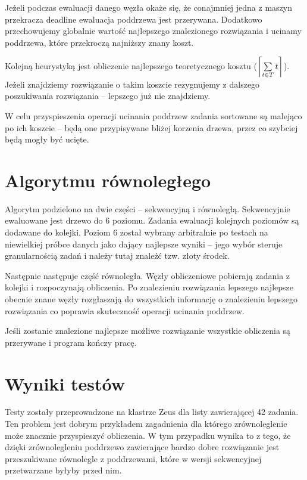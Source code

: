 \documentclass[a4paper]{article}
\DeclarePairedDelimiter{\ceil}{\lceil}{\rceil}
\begin{document}
Jeżeli podczas ewaluacji danego węzła okaże się, że conajmniej jedna z maszyn przekracza deadline ewaluacja poddrzewa jest przerywana. Dodatkowo przechowujemy globalnie wartość najlepszego znalezionego rozwiązania i ucinamy poddrzewa, które przekroczą najniższy znany koszt.

Kolejną heurystyką jest obliczenie najlepszego teoretycznego kosztu ($\ceil*{\mathop\sum\limits_{t \in T} t}$). Jeżeli znajdziemy rozwiązanie o takim koszcie rezygnujemy z dalszego poszukiwania rozwiązania – lepszego już nie znajdziemy.

W celu przyspieszenia operacji ucinania poddrzew zadania sortowane są malejąco po ich koszcie – będą one przypisywane bliżej korzenia drzewa, przez co szybciej będą mogły być ucięte.

\section{Algorytmu równoległego}

Algorytm podzielono na dwie części – sekwencyjną i równoległą. Sekwencyjnie ewaluowane jest drzewo do 6 poziomu. Zadania ewaluacji kolejnych poziomów są dodawane do kolejki. Poziom 6 został wybrany arbitralnie po testach na niewielkiej próbce danych jako dający najlepsze wyniki – jego wybór steruje granularnością zadań i należy tutaj znaleźć tzw. złoty środek.

Następnie następuje część równoległa. Węzły obliczeniowe pobierają zadania z kolejki i rozpoczynają obliczenia. Po znalezieniu rozwiązania lepszego najlepsze obecnie znane węzły rozgłaszają do wszystkich informację o znalezieniu lepszego rozwiązania co poprawia skuteczność operacji ucinania poddrzew.

Jeśli zostanie znalezione najlepsze możliwe rozwiązanie wszystkie obliczenia są przerywane i program kończy pracę.

\section{Wyniki testów}

Testy zostały przeprowadzone na klastrze Zeus dla listy zawierającej 42 zadania. Ten problem jest dobrym przykładem zagadnienia dla którego zrównoleglenie może znacznie przyspieszyć obliczenia. W tym przypadku wynika to z tego, że dzięki zrównolegleniu poddrzewo zawierające bardzo dobre rozwiązanie jest przeszukiwane  równolegle z poddrzewami, które w wersji sekwencyjnej przetwarzane byłyby przed nim.
\end{document}
